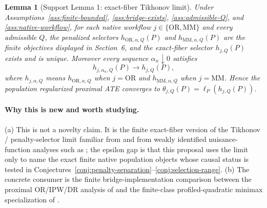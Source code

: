 \documentclass[11pt]{article}
\theoremstyle{definition}
\theoremstyle{plain}
\newtheorem{lemma}{Lemma}
\theoremstyle{remark}
\begin{document}
\begin{lemma}[Support Lemma 1: exact-fiber Tikhonov limit]\label{lem:tikhonov-limit}
Under Assumptions~\ref{ass:finite-bounded}, \ref{ass:bridge-exists},
\ref{ass:admissible-Q}, and \ref{ass:native-workflow}, for each native
workflow \(j\in\{\mathrm{OR},\mathrm{MM}\}\) and every admissible \(Q\), the
penalized selectors \(h_{\mathrm{OR},\alpha,Q}(P)\) and
\(h_{\mathrm{MM},\alpha,Q}(P)\) are the finite objectives displayed in
Section~6, and the exact-fiber selector \(h_{j,Q}(P)\) exists and is unique.
Moreover every sequence \(\alpha_n\downarrow0\) satisfies
\[
h_{j,\alpha_n,Q}(P)\longrightarrow h_{j,Q}(P),
\]
where \(h_{j,\alpha,Q}\) means \(h_{\mathrm{OR},\alpha,Q}\) when
\(j=\mathrm{OR}\) and \(h_{\mathrm{MM},\alpha,Q}\) when \(j=\mathrm{MM}\).
Hence the population regularized proximal ATE converges to
\(\theta_{j,Q}(P)=\ell_P(h_{j,Q}(P))\).
\end{lemma}
\paragraph{Why this is new and worth studying.}
(a) This is not a novelty claim.  It is the finite exact-fiber version of
the Tikhonov / penalty-selector limit familiar from
\citet{DarollesFanFlorensRenault2011Econometrica} and from weakly identified
nuisance-function analyses such as
\citet{BennettKallusMaoNeweySyrgkanisUehara2023COLT}; the epsilon gap is
that this proposal uses the limit only to name the exact finite native
population objects whose causal status is tested in
Conjectures~\ref{conj:penalty-separation}--\ref{conj:selection-range}.
(b) The concrete consumer is the finite bridge-implementation comparison
between the proximal OR/IPW/DR analysis of
\citet{CuiPuShiMiaoTchetgen2024JASA} and the finite-class profiled-quadratic
minimax specialization of \citet{KallusMaoUehara2021MinimaxNC}.
\end{document}
